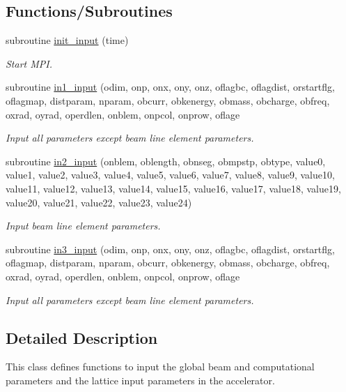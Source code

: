 \subsection*{Functions/\+Subroutines}
\begin{DoxyCompactItemize}
\item 
subroutine \mbox{\hyperlink{namespaceinputclass_ae7866a50f5576b1fea0aa1b10f98690b}{init\+\_\+input}} (time)
\begin{DoxyCompactList}\small\item\em Start M\+PI. \end{DoxyCompactList}\item 
subroutine \mbox{\hyperlink{namespaceinputclass_a907319f6e5d34930fbc63f5af426e9bd}{in1\+\_\+input}} (odim, onp, onx, ony, onz, oflagbc, oflagdist, orstartflg, oflagmap, distparam, nparam, obcurr, obkenergy, obmass, obcharge, obfreq, oxrad, oyrad, operdlen, onblem, onpcol, onprow, oflage
\begin{DoxyCompactList}\small\item\em Input all parameters except beam line element parameters. \end{DoxyCompactList}\item 
subroutine \mbox{\hyperlink{namespaceinputclass_a943f99f8cd6dc0476378072a9d4d27cd}{in2\+\_\+input}} (onblem, oblength, obnseg, obmpstp, obtype, value0, value1, value2, value3, value4, value5, value6, value7, value8, value9, value10, value11, value12, value13, value14, value15, value16, value17, value18, value19, value20, value21, value22, value23, value24)
\begin{DoxyCompactList}\small\item\em Input beam line element parameters. \end{DoxyCompactList}\item 
subroutine \mbox{\hyperlink{namespaceinputclass_af6c761d115ea894925da33378b4bdf7d}{in3\+\_\+input}} (odim, onp, onx, ony, onz, oflagbc, oflagdist, orstartflg, oflagmap, distparam, nparam, obcurr, obkenergy, obmass, obcharge, obfreq, oxrad, oyrad, operdlen, onblem, onpcol, onprow, oflage
\begin{DoxyCompactList}\small\item\em Input all parameters except beam line element parameters. \end{DoxyCompactList}\end{DoxyCompactItemize}


\subsection{Detailed Description}
This class defines functions to input the global beam and computational parameters and the lattice input parameters in the accelerator. 

